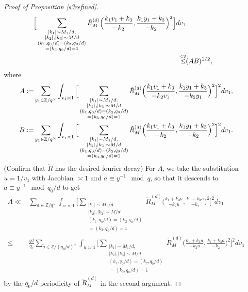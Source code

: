 \begin{proof}[Proof of Proposition \ref{s3refined}]
\begin{align*}
        \Big[\sum_{\substack{|k_1|\sim M_1/d,\\|k_2|,|k_3|\sim M/d\\
        (k_1,q_0/d)=(k_2,q_0/d)\\=(k_3,q_0/d)=1}}
        \tilde{R}_M^{(d)}\Big(\frac{k_1v_1+k_3}{-k_2},\frac{k_1y_1+k_3}{-k_2}\Big)^2\Big]dv_1\\
        \stackon{CS}{\leq}& (AB)^{1/2},
\end{align*} 
where\begin{align*}
    A\mathrel{\mathop:}=& \sum_{y_1\in \mathbb{Z}/q^\times} \int_{v_1\asymp 1} 
    \Big[\sum_{\substack{|k_1|\sim M_1/d,\\|k_2|,|k_3|\sim M/d\\
        (k_1,q_0/d)=(k_2,q_0/d)\\=(k_3,q_0/d)=1}}
        \tilde{R}_M^{(d)}\Big(\frac{k_1v_1+k_3}{-k_2v_1},\frac{k_1y_1+k_3}{-k_2y_1}\Big)^2\Big]^2 dv_1,\\
    B\mathrel{\mathop:}=&\sum_{y_1\in \mathbb{Z}/q^\times} \int_{v_1\asymp 1} 
    \Big[\sum_{\substack{|k_1|\sim M_1/d,\\|k_2|,|k_3|\sim M/d\\
        (k_1,q_0/d)=(k_2,q_0/d)\\=(k_3,q_0/d)=1}}
        \tilde{R}_M^{(d)}\Big(\frac{k_1v_1+k_3}{-k_2},\frac{k_1y_1+k_3}{-k_2}\Big)^2\Big]^2 dv_1.
\end{align*}
(Confirm that $\tilde{R}$ has the desired fourier decay)
For $A$, we take the substitution $u=1/v_1$ with Jacobian $\asymp 1$ and $a\equiv y^{-1} \mod q$, so that it descends to $a\equiv y^{-1}\mod {q_0}/d$ to get \begin{align*}
A\ll & \sum_{a\in \mathbb{Z}/q^\times} \int_{u\asymp 1} 
\Big[\sum_{\substack{|k_1|\sim M_1/d,\\|k_2|,|k_3|\sim M/d\\
    (k_1,q_0/d)=(k_2,q_0/d)\\=(k_3,q_0/d)=1}}
    \tilde{R}_M^{(d)}\Big(\frac{k_1+k_3u}{-k_2u},\frac{k_1+k_3a}{-k_2}\Big)^2\Big]^2 dv_1\\
    \leq& \frac{qd}{q_0}\sum_{\tilde{a}\in \mathbb{Z}/{(q_0/d)}^\times} \int_{u\asymp 1} 
    \Big[\sum_{\substack{|k_1|\sim M_1/d,\\|k_2|,|k_3|\sim M/d\\
        (k_1,q_0/d)=(k_2,q_0/d)\\=(k_3,q_0/d)=1}}
        \tilde{R}_M^{(d)}\Big(\frac{k_1+k_3u}{-k_2u},\frac{k_1+k_3a}{-k_2}\Big)^2\Big]^2 dv_1
\end{align*}
by the $q_0/d$ periodicity of $\tilde{R}^{(d)}_M$ in the second argument.

\end{proof}
